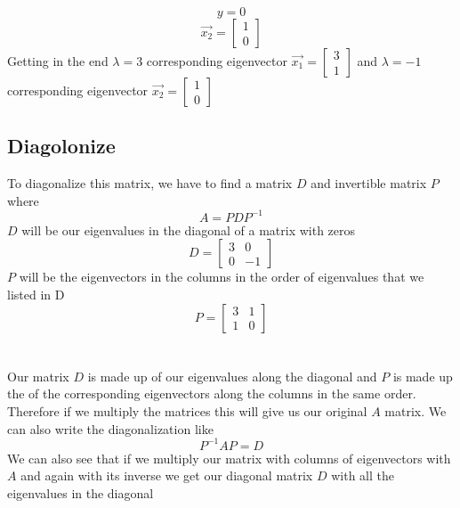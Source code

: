 \documentclass[12pt]{article}
\begin{document}
\begin{equation*}
y = 0
\end{equation*}
\begin{equation*}
\vec{x_2} = \begin{bmatrix}1 \\ 0 \end{bmatrix}
\end{equation*}
Getting in the end $\lambda = 3$ corresponding eigenvector $\vec{x_1} = \begin{bmatrix}3 \\ 1\end{bmatrix}$ and $\lambda = -1$ corresponding eigenvector $\vec{x_2} = \begin{bmatrix}1 \\ 0\end{bmatrix}$
\subsection{Diagolonize} To diagonalize this matrix, we have to find a matrix $D$ and invertible matrix $P$ where
\begin{equation*}A = PDP^{-1}\end{equation*}
$D$ will be our eigenvalues in the diagonal of a matrix with zeros
\begin{equation*}D = \begin{bmatrix}3 & 0 \\ 0 & -1\end{bmatrix}\end{equation*}
$P$ will be the eigenvectors in the columns in the order of eigenvalues that we listed in D
\begin{equation*}P = \begin{bmatrix}3 & 1 \\ 1 & 0\end{bmatrix}\end{equation*}
\\\\ Our matrix $D$ is made up of our eigenvalues along the diagonal and $P$ is made up the of the corresponding eigenvectors along the columns in the same order. Therefore if we multiply the matrices this will give us our original $A$ matrix. We can also write the diagonalization like
\begin{equation*}P^{-1}AP = D\end{equation*}
We can also see that if we multiply our matrix with columns of eigenvectors with $A$ and again with its inverse we get our diagonal matrix $D$ with all the eigenvalues in the diagonal\\\\
\end{document}
